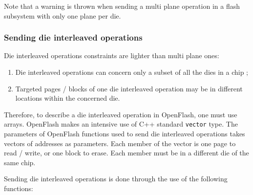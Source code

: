 Note that a warning is thrown when sending a multi plane operation in a flash subsystem with only one plane per die.

\subsubsection{Sending die interleaved operations}
Die interleaved operations constraints are lighter than multi plane ones:
\begin{enumerate}
  \item Die interleaved operations can concern only a subset of all the dies in a chip ;
  \item Targeted pages / blocks of one die interleaved operation may be in different locations within the concerned die.
\end{enumerate}

Therefore, to describe a die interleaved operation in OpenFlash, one must use arrays. OpenFlash makes an intensive use of C++ standard \verb+vector+ type. The parameters of OpenFlash functions used to send die interleaved operations takes vectors of addresses as parameters. Each member of the vector is one page to read / write, or one block to erase. Each member must be in a different die of the same chip.

Sending die interleaved operations is done through the use of the following functions:

